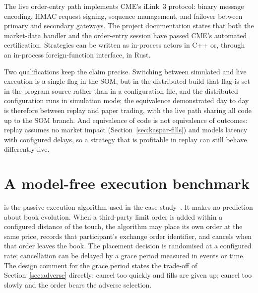 The live order-entry path implements CME's iLink~3 protocol: binary message encoding, HMAC request
signing, sequence management, and failover between primary and secondary gateways. The project
documentation states that both the market-data handler and the order-entry session have passed CME's
automated certification. Strategies can be written as in-process actors in C++ or, through an
in-process foreign-function interface, in Rust.

Two qualifications keep the claim precise. Switching between simulated and live execution is a single
flag in the SOM, but in the distributed build that flag is set in the program source rather than in a
configuration file, and the distributed configuration runs in simulation mode; the equivalence
demonstrated day to day is therefore between replay and paper trading, with the live path sharing all
code up to the SOM branch. And equivalence of code is not equivalence of outcomes: replay assumes no
market impact (Section~\ref{sec:kaspar-fills}) and models latency with configured delays, so a strategy
that is profitable in replay can still behave differently live.

\section{A model-free execution benchmark}
\label{sec:shadow}

\pov{} is the passive execution algorithm used in the case study~\citep{maciejewski_shadow}. It
makes no prediction about book evolution. When a third-party limit order is added within a
configured distance of the touch, the algorithm may place its own order at the same price, records
that participant's exchange order identifier, and cancels when that order leaves the book. The
placement decision is randomised at a configured rate; cancellation can be delayed by a grace
period measured in events or time. The design comment for the grace period states the trade-off
of Section~\ref{sec:adverse} directly: cancel too quickly and fills are given up; cancel too
slowly and the order bears the adverse selection.

